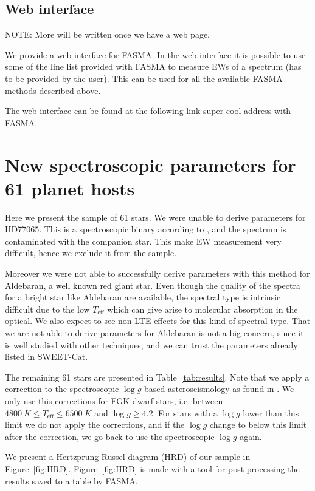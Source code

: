 \documentclass{aa}
\begin{document}
\subsection{Web interface}
\label{sub:Web interface}
NOTE: More will be written once we have a web page.

We provide a web interface for FASMA. In the web interface it is possible to use
some of the line list provided with FASMA to measure EWs of a spectrum (has to
be provided by the user). This can be used for all the available FASMA methods
described above.

The web interface can be found at the following link
\url{super-cool-address-with-FASMA}.



\section{New spectroscopic parameters for 61 planet hosts}
\label{sec:results}
Here we present the sample of 61 stars. We were unable to derive parameters for
HD77065. This is a spectroscopic binary according to \cite{Pourbaix2004}, and
the spectrum is contaminated with the companion star. This make EW measurement
very difficult, hence we exclude it from the sample.

Moreover we were not able to successfully derive parameters with this method for
Aldebaran, a well known red giant star. Even though the quality of the spectra
for a bright star like Aldebaran are available, the spectral type is intrinsic
difficult due to the low $T_\mathrm{eff}$ which can give arise to molecular
absorption in the optical. We also expect to see non-LTE effects for this kind
of spectral type. That we are not able to derive parameters for Aldebaran is not
a big concern, since it is well studied with other techniques, and we can trust
the parameters already listed in SWEET-Cat.

The remaining 61 stars are presented in Table~\ref{tab:results}. Note that we
apply a correction to the spectroscopic $\log g$ based asteroseismology as
found in \citet{Mortier2014}. We only use this corrections for FGK dwarf stars,
i.e. between $\SI{4800}{K}\leq T_\mathrm{eff} \leq \SI{6500}{K}$ and
$\log g\geq4.2$. For stars with a $\log g$ lower than this limit we do not apply
the corrections, and if the $\log g$ change to below this limit after the
correction, we go back to use the spectroscopic $\log g$ again.

We present a Hertzprung-Russel diagram (HRD) of our sample in
Figure~\ref{fig:HRD}. Figure~\ref{fig:HRD} is made with a tool for post
processing the results saved to a table by FASMA.
\end{document}
